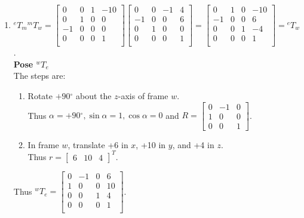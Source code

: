 \documentclass[12pt,letterpaper]{article}
\newcommand{\rca}{\cos\alpha} \newcommand{\rcb}{\cos\beta} \newcommand{\rcg}{\cos\gamma}
\newcommand{\rsa}{\sin\alpha} \newcommand{\rsb}{\sin\beta} \newcommand{\rsg}{\sin\gamma}
\newcommand{\degsym}{\ensuremath{^{\circ}}}
\begin{document}
\begin{enumerate}
\item
$
{^{e}T_m} {^{m}T_w}
= \begin{bmatrix}
 0 & 0 & 1 & -10\\
 0 & 1 & 0 &   0\\
-1 & 0 & 0 &   0\\
 0 & 0 & 0 &   1\\
\end{bmatrix}
\begin{bmatrix}
 0 & 0 & -1 & 4\\
-1 & 0 &  0 & 6\\
 0 & 1 &  0 & 0\\
 0 & 0 &  0 & 1\\
\end{bmatrix}
= \begin{bmatrix}
 0 & 1 & 0 & -10\\
-1 & 0 & 0 &   6\\
 0 & 0 & 1 &  -4\\
 0 & 0 & 0 &   1\\
\end{bmatrix}
= {^{e}T_w}
$.\\
\textbf{Pose $^{w}T_e$}\\
The steps are:
\begin{enumerate}
\item Rotate $+90\degsym$ about the $z$-axis of frame $w$.\\
Thus $\alpha = +90\degsym, \rsa = 1, \rca = 0$ and 
$R = \begin{bmatrix} 0 & -1 & 0 \\ 1 & 0 & 0 \\ 0 & 0 & 1 \end{bmatrix}$.
\item In frame $w$, translate +6 in $x$, +10 in $y$, and +4 in $z$.\\Thus $r = \begin{bmatrix} 6 & 10 & 4 \end{bmatrix}^T$.
\end{enumerate}
Thus $^{w}T_e = \begin{bmatrix}
0 & -1 & 0 &  6\\
1 &  0 & 0 & 10\\
0 &  0 & 1 &  4\\
0 &  0 & 0 &  1\\
\end{bmatrix}$.


\end{enumerate}
\end{document}
